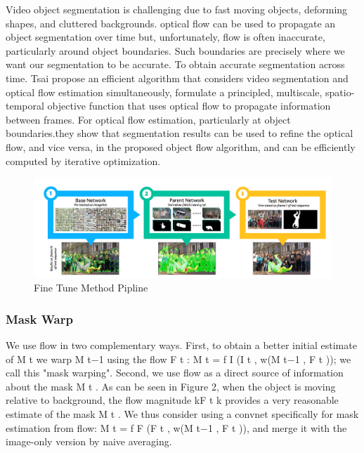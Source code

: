 Video object segmentation is challenging due to fast moving objects, deforming shapes, and cluttered backgrounds. optical flow can be used to propagate an object segmentation over time but, unfortunately, flow is often inaccurate, particularly around object boundaries. Such boundaries are precisely where we want our segmentation to be accurate. To obtain accurate segmentation across time.  Tsai \etal propose an efficient algorithm\cite{OFL}  that considers video segmentation and optical flow estimation simultaneously, formulate a principled, multiscale, spatio-temporal objective function that uses optical flow to propagate information between frames. For optical flow estimation, particularly at object boundaries.they show that segmentation results can be used to refine the optical flow, and vice versa, in the proposed object flow algorithm, and can be efficiently computed by iterative optimization.


\begin{figure}
    \begin{center}
        \includegraphics[width=\textwidth]{figure/fine_tune.png}
    \end{center}
    \caption{Fine Tune Method Pipline}
    \label{fine_tune}
\end{figure}


\subsubsection{Mask Warp}
We use flow in two complementary ways. First, to obtain a better initial estimate of M t we warp M t−1 using the flow F t : M t = f I (I t , w(M t−1 , F t )); we call this "mask warping". Second, we use flow as a direct source of information about the mask M t . As can be seen in Figure 2, when the object is moving relative to background, the flow magnitude kF t k provides a very reasonable estimate of the mask M t . We thus consider using a convnet specifically for mask estimation from flow: M t = f F (F t , w(M t−1 , F t )), and merge it with the image-only version by naive averaging.

